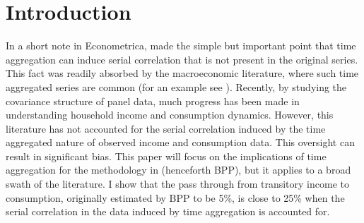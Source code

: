\documentclass[titlepage]{\econtex}\newcommand{\texname}{BPP_TimeAgg}
\begin{document}
\titlepagefinish
\setcounter{page}{1}

\pagebreak
\section{Introduction}
In a short note in Econometrica, \cite{working_note_1960} made the simple but important point that time aggregation can induce serial correlation that is not present in the original series. This fact was readily absorbed by the macroeconomic literature, where such time aggregated series are common (for an example see \cite{campbell_consumption_1989}). Recently, by studying the covariance structure of panel data, much progress has been made in understanding household income and consumption dynamics. However, this literature has not accounted for the serial correlation induced by the time aggregated nature of observed income and consumption data. This oversight can result in significant bias. This paper will focus on the implications of time aggregation for the methodology in \cite{blundell_consumption_2008} (henceforth BPP), but it applies to a broad swath of the literature. I show that the pass through from transitory income to consumption, originally estimated by BPP to be 5\%, is close to 25\% when the serial correlation in the data induced by time aggregation is accounted for.
\end{document}
